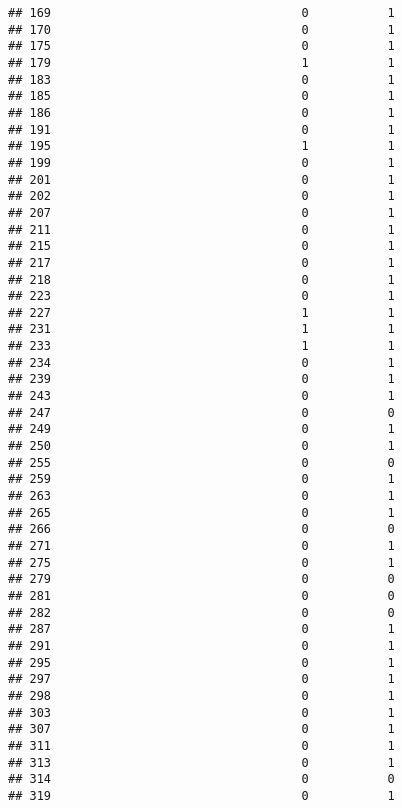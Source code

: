 \documentclass[
]{article}
\begin{document}
\begin{verbatim}
## 169                                   0           1
## 170                                   0           1
## 175                                   0           1
## 179                                   1           1
## 183                                   0           1
## 185                                   0           1
## 186                                   0           1
## 191                                   0           1
## 195                                   1           1
## 199                                   0           1
## 201                                   0           1
## 202                                   0           1
## 207                                   0           1
## 211                                   0           1
## 215                                   0           1
## 217                                   0           1
## 218                                   0           1
## 223                                   0           1
## 227                                   1           1
## 231                                   1           1
## 233                                   1           1
## 234                                   0           1
## 239                                   0           1
## 243                                   0           1
## 247                                   0           0
## 249                                   0           1
## 250                                   0           1
## 255                                   0           0
## 259                                   0           1
## 263                                   0           1
## 265                                   0           1
## 266                                   0           0
## 271                                   0           1
## 275                                   0           1
## 279                                   0           0
## 281                                   0           0
## 282                                   0           0
## 287                                   0           1
## 291                                   0           1
## 295                                   0           1
## 297                                   0           1
## 298                                   0           1
## 303                                   0           1
## 307                                   0           1
## 311                                   0           1
## 313                                   0           1
## 314                                   0           0
## 319                                   0           1

\end{verbatim}
\end{document}
